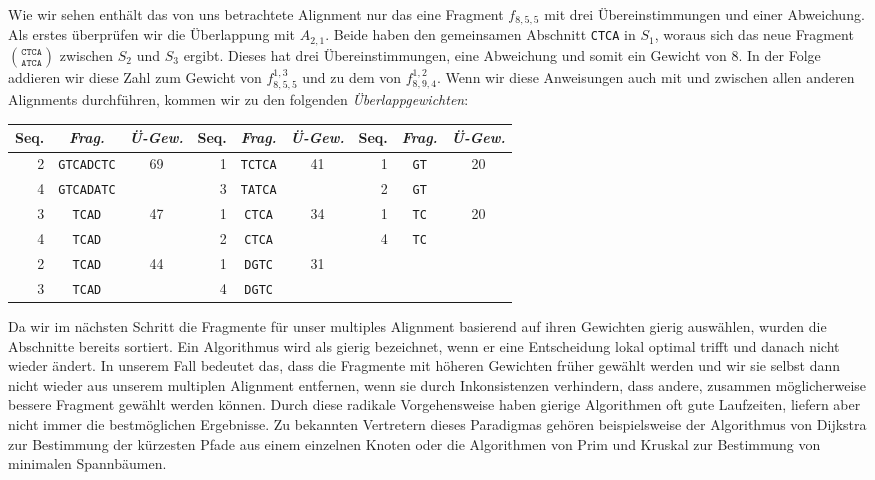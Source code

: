 Wie wir sehen enthält das von uns betrachtete Alignment nur das eine Fragment $f_{8,5,5}$ mit drei Übereinstimmungen und einer Abweichung. Als erstes überprüfen wir die Überlappung mit $A_{2,1}$. Beide haben den gemeinsamen Abschnitt \texttt{CTCA} in $S_1$, woraus sich das neue Fragment ${\texttt{CTCA}}\choose{\texttt{ATCA}}$ zwischen $S_2$ und $S_3$ ergibt. Dieses hat drei Übereinstimmungen, eine Abweichung und somit ein Gewicht von 8. In der Folge addieren wir diese Zahl zum Gewicht von $f_{8,5,5}^{1,3}$ und zu dem von $f_{8,9,4}^{1,2}$. Wenn wir diese Anweisungen auch mit und zwischen allen anderen Alignments durchführen, kommen wir zu den folgenden \emph{Überlappgewichten}:

\begin{tabular}{r|c|c||r|c|c||r|c|c}
	Seq. & \emph{Frag.} & \emph{Ü-Gew.} & Seq. & \emph{Frag.} & \emph{Ü-Gew.} & Seq. & \emph{Frag.} & \emph{Ü-Gew.}\\
	\hline
	2 & \texttt{GTCADCTC} & \multirow{2}{*}{69} & 1 & \texttt{TCTCA} & \multirow{2}{*}{41} & 1 & \texttt{GT} &\multirow{2}{*}{20} \\
	4 & \texttt{GTCADATC} &                     & 3 & \texttt{TATCA} &                     & 2 & \texttt{GT} & \\
	3 & \texttt{TCAD} & \multirow{2}{*}{47} & 1 & \texttt{CTCA} & \multirow{2}{*}{34} & 1 & \texttt{TC} & \multirow{2}{*}{20} \\
	4 & \texttt{TCAD} &                     & 2 & \texttt{CTCA} &                          & 4 & \texttt{TC} & \\
	2 & \texttt{TCAD} & \multirow{2}{*}{44} & 1 & \texttt{DGTC} & \multirow{2}{*}{31} &    &   & \\
    3 & \texttt{TCAD} &                     & 4 & \texttt{DGTC} &                     &    &   & \\
\end{tabular}

Da wir im nächsten Schritt die Fragmente für unser multiples Alignment basierend auf ihren Gewichten gierig auswählen, wurden die Abschnitte bereits sortiert. Ein Algorithmus wird als gierig bezeichnet, wenn er eine Entscheidung lokal optimal trifft und danach nicht wieder ändert. In unserem Fall bedeutet das, dass die Fragmente mit höheren Gewichten früher gewählt werden und wir sie selbst dann nicht wieder aus unserem multiplen Alignment entfernen, wenn sie durch Inkonsistenzen verhindern, dass andere, zusammen möglicherweise bessere Fragment gewählt werden können. Durch diese radikale Vorgehensweise haben gierige Algorithmen oft gute Laufzeiten, liefern aber nicht immer die bestmöglichen Ergebnisse. Zu bekannten Vertretern dieses Paradigmas gehören beispielsweise der Algorithmus von Dijkstra zur Bestimmung der kürzesten Pfade aus einem einzelnen Knoten oder die Algorithmen von Prim und Kruskal zur Bestimmung von minimalen Spannbäumen.

